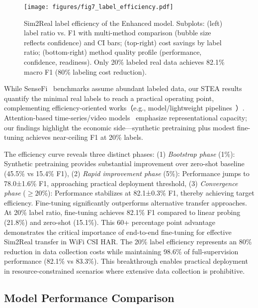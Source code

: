 \documentclass[journal]{IEEEtran}
\begin{document}
\begin{figure}[ht]
\centering
\texttt{[image: figures/fig7\_label\_efficiency.pdf]}%
\caption{Sim2Real label efficiency of the Enhanced model. Subplots: (left) label ratio vs. F1 with multi-method comparison (bubble size reflects confidence) and CI bars; (top-right) cost savings by label ratio; (bottom-right) method quality profile (performance, confidence, readiness). Only 20\% labeled real data achieves 82.1\% macro F1 (80\% labeling cost reduction).}
\label{fig:label_efficiency}
\end{figure}

While SenseFi~\cite{yang2023sensefi} benchmarks assume abundant labeled data, our STEA results quantify the minimal real labels to reach a practical operating point, complementing efficiency-oriented works（e.g., model/lightweight pipelines~\cite{efficientfi2022}）. Attention-based time-series/video models~\cite{li2020tea,bertasius2021timesformer,lim2021tft,zhou2021informer} emphasize representational capacity; our findings highlight the economic side—synthetic pretraining plus modest fine-tuning achieves near-ceiling F1 at 20\% labels.

The efficiency curve reveals three distinct phases: (1) \textit{Bootstrap phase} (1\%): Synthetic pretraining provides substantial improvement over zero-shot baseline (45.5\% vs 15.4\% F1), (2) \textit{Rapid improvement phase} (5\%): Performance jumps to 78.0±1.6\% F1, approaching practical deployment threshold, (3) \textit{Convergence phase} ($\geq 20\%$): Performance stabilizes at 82.1±0.3\% F1, thereby achieving target efficiency.
Fine-tuning significantly outperforms alternative transfer approaches. At 20\% label ratio, fine-tuning achieves 82.1\% F1 compared to linear probing (21.8\%) and zero-shot (15.1\%). This 60+ percentage point advantage demonstrates the critical importance of end-to-end fine-tuning for effective Sim2Real transfer in WiFi CSI HAR.
The 20\% label efficiency represents an 80\% reduction in data collection costs while maintaining 98.6\% of full-supervision performance (82.1\% vs 83.3\%). This breakthrough enables practical deployment in resource-constrained scenarios where extensive data collection is prohibitive.

\subsection{Model Performance Comparison}
\end{document}
